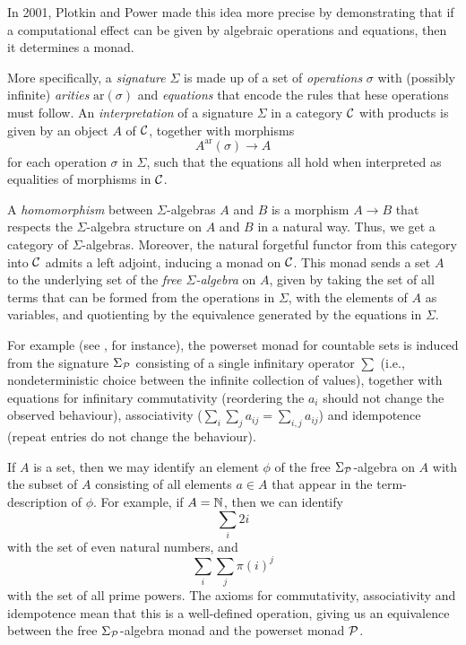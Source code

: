 \documentclass[11pt]{report}
\begin{document}
In 2001, Plotkin and Power \cite{PlotkinPower} made this idea more precise by demonstrating that if a computational effect can be given by algebraic operations and equations, then it determines a monad. 

More specifically, a \emph{signature} $\Sigma$ is made up of a set of \emph{operations} $\sigma$ with (possibly infinite) \emph{arities} $\text{ar}(\sigma)$ and \emph{equations} that encode the rules that hese operations must follow.
An \emph{interpretation} of a signature $\Sigma$ in a category ${\mathcal{C}}$ with products is given by an object $A$ of ${\mathcal{C}}$, together with morphisms
\[
	A^\text{ar}(\sigma) \to A
	\]
for each operation $\sigma$ in $\Sigma$, such that the equations all hold when interpreted as equalities of morphisms in ${\mathcal{C}}$.

A \emph{homomorphism} between $\Sigma$-algebras $A$ and $B$ is a morphism $A \to B$ that respects the $\Sigma$-algebra structure on $A$ and $B$ in a natural way. 
Thus, we get a category of $\Sigma$-algebras.
Moreover, the natural forgetful functor from this category into ${\mathcal{C}}$ admits a left adjoint, inducing a monad on ${\mathcal{C}}$.
This monad sends a set $A$ to the underlying set of the \emph{free $\Sigma$-algebra} on $A$, given by taking the set of all terms that can be formed from the operations in $\Sigma$, with the elements of $A$ as variables, and quotienting by the equivalence generated by the equations in $\Sigma$.

For example (see \cite{Powerset}, for instance), the powerset monad for countable sets is induced from the signature $\Sigma_\mathcal P$ consisting of a single infinitary operator $\sum$ (i.e., nondeterministic choice between the infinite collection of values), together with equations for infinitary commutativity (reordering the $a_i$ should not change the observed behaviour), associativity ($\sum_i \sum_j a_{ij} = \sum_{i,j} a_{ij}$) and idempotence (repeat entries do not change the behaviour).

If $A$ is a set, then we may identify an element $\phi$ of the free $\Sigma_\mathcal P$-algebra on $A$ with the subset of $A$ consisting of all elements $a\in A$ that appear in the term-description of $\phi$.
For example, if $A=\mathbb{N}$, then we can identify
\[
	\sum_i 2i
	\]
with the set of even natural numbers, and
\[
	\sum_i \sum_j \pi(i)^j
	\]
with the set of all prime powers.
The axioms for commutativity, associativity and idempotence mean that this is a well-defined operation, giving us an equivalence between the free $\Sigma_\mathcal P$-algebra monad and the powerset monad $\mathcal P$.
\end{document}
